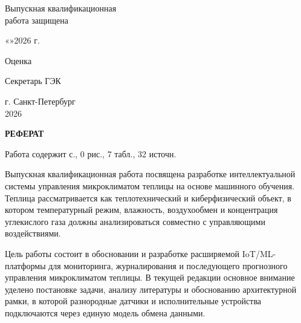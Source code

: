 \documentclass[a4paper,14pt]{extarticle}
\newcommand{\VkrStructuralSectionNoToc}[1]{%
  \begin{center}\bfseries #1\end{center}%
  \par\nopagebreak\vspace{12pt}%
}
\begin{document}
\begin{titlepage}
\vspace{0.4cm}

\begin{flushright}
\begin{minipage}{0.46\textwidth}
Выпускная квалификационная\\
работа защищена

\vspace{0.15cm}

«\underline{\hspace{0.8cm}}»\underline{\hspace{2.5cm}}2026 г.

\vspace{0.18cm}

Оценка

\vspace{0.12cm}

\underline{\hspace{3.0cm}}

\vspace{0.18cm}

Секретарь ГЭК \underline{\hspace{2.2cm}}
\end{minipage}
\end{flushright}

\vfill

\begin{center}
г. Санкт-Петербург\\
2026
\end{center}
\end{titlepage}

\setcounter{page}{2}
\hypersetup{pageanchor=true}

\VkrStructuralSectionNoToc{РЕФЕРАТ}\label{ux440ux435ux444ux435ux440ux430ux442}

Работа содержит \pageref{LastPage} с., 0 рис., 7 табл., 32 источн.

Выпускная квалификационная работа посвящена разработке интеллектуальной
системы управления микроклиматом теплицы на основе машинного обучения.
Теплица рассматривается как теплотехнический и киберфизический объект, в
котором температурный режим, влажность, воздухообмен и концентрация
углекислого газа должны анализироваться совместно с управляющими
воздействиями.

Цель работы состоит в обосновании и разработке расширяемой
IoT/ML-платформы для мониторинга, журналирования и последующего
прогнозного управления микроклиматом теплицы. В текущей редакции
основное внимание уделено постановке задачи, анализу литературы и
обоснованию архитектурной рамки, в которой разнородные датчики и
исполнительные устройства подключаются через единую модель обмена
данными.
\end{document}

